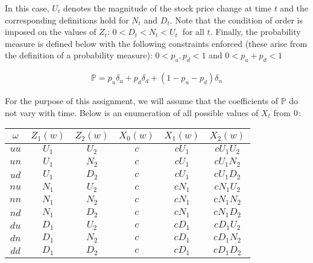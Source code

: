 \documentclass{article}
\begin{document}
In this case, $U_t$ denotes the magnitude of the stock price change at time $t$ and the corresponding definitions hold for $N_t$ and $D_t$. Note that the condition of order is imposed on the values of $Z_t$: $0<D_t<N_t<U_t\medspace$ for all $t$. Finally, the probability measure is defined below with the following constraints enforced (these arise from the definition of a probability measure): $0<p_u,p_d<1$ and $0<p_u+p_d<1$

\begin{align*}
    \mathbb{P} = p_u\delta_u + p_d\delta_d + (1-p_u-p_d)\delta_n
\end{align*}

For the purpose of this assignment, we will assume that the coefficients of $\mathbb{P}$ do not vary with time. Below is an enumeration of all possible values of $X_t$ from $0\let\le2$:

\begin{center}
\begin{tabular}{|c|c|c|c|c|c|}
\hline
$\omega$ & $Z_1(w)$ & $Z_2(w)$ & $X_0(w)$ & $X_1(w)$ & $X_2(w)$ \\
\hline
\hline
$uu$ & $U_1$ & $U_2$ & $c$ & $cU_1$ & $cU_1U_2$ \\\hline
$un$ & $U_1$ & $N_2$ & $c$ & $cU_1$ & $cU_1N_2$ \\\hline
$ud$ & $U_1$ & $D_2$ & $c$ & $cU_1$ & $cU_1D_2$ \\\hline
$nu$ & $N_1$ & $U_2$ & $c$ & $cN_1$ & $cN_1U_2$ \\\hline
$nn$ & $N_1$ & $N_2$ & $c$ & $cN_1$ & $cN_1N_2$ \\\hline
$nd$ & $N_1$ & $D_2$ & $c$ & $cN_1$ & $cN_1D_2$ \\\hline
$du$ & $D_1$ & $U_2$ & $c$ & $cD_1$ & $cD_1U_2$ \\\hline
$dn$ & $D_1$ & $N_2$ & $c$ & $cD_1$ & $cD_1N_2$ \\\hline
$dd$ & $D_1$ & $D_2$ & $c$ & $cD_1$ & $cD_1D_2$ \\\hline
\end{tabular}
\end{center}
\end{document}
